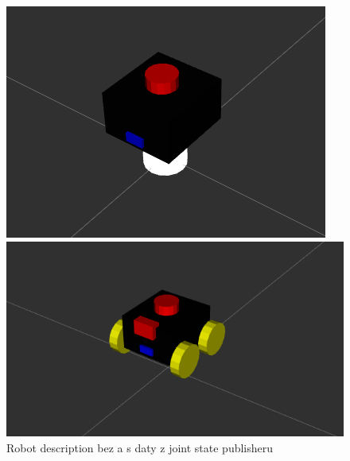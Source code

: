 \begin{figure}[h!]
	\centering
	\begin{minipage}[c]{0.5\textwidth}
		\centering
		\includegraphics[scale=0.45]{obrazky-figures/robot_description_no_joint_states.png}
	\end{minipage}%
	\begin{minipage}[c]{0.5\textwidth}
		\centering
		\includegraphics[scale=0.4]{obrazky-figures/robot_description_joint_states.png}
	\end{minipage}
	\caption{Robot description bez a s daty z joint state publisheru}
	\label{}
\end{figure}

